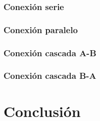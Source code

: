 \documentclass[a4paper]{article}
\begin{document}
\subsubsection*{Conexión serie}

\subsubsection*{Conexión paralelo}

\subsubsection*{Conexión cascada A-B}

\subsubsection*{Conexión cascada B-A}

\section*{Conclusión}
\end{document}
